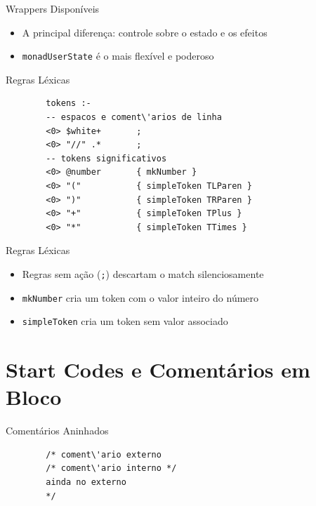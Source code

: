 \begin{frame}[fragile]{Wrappers Disponíveis}

    \begin{itemize}

        \item
        A principal diferença: controle sobre o estado e os efeitos
        \item
        \texttt{monadUserState} é o mais flexível e poderoso
    \end{itemize}
\end{frame}

\begin{frame}[fragile]{Regras Léxicas}

    \begin{lstlisting}
        tokens :-
        -- espacos e coment\'arios de linha
        <0> $white+       ;
        <0> "//" .*       ;
        -- tokens significativos
        <0> @number       { mkNumber }
        <0> "("           { simpleToken TLParen }
        <0> ")"           { simpleToken TRParen }
        <0> "+"           { simpleToken TPlus }
        <0> "*"           { simpleToken TTimes }
    \end{lstlisting}
\end{frame}

\begin{frame}[fragile]{Regras Léxicas}

    \begin{itemize}

        \item
        Regras sem ação (\texttt{;}) descartam o match
        silenciosamente
        \item
        \texttt{mkNumber} cria um token com o valor inteiro
        do número
        \item
        \texttt{simpleToken} cria um token sem valor
        associado
    \end{itemize}
\end{frame}


\section{Start Codes e Comentários em
Bloco}\label{start-codes-e-comentuxe1rios-em-bloco}

\begin{frame}[fragile]{Comentários Aninhados}

    \begin{lstlisting}
        /* coment\'ario externo
        /* coment\'ario interno */
        ainda no externo
        */
    \end{lstlisting}
\end{frame}

